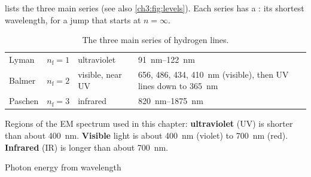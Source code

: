  lists the three main series (see also \cref{ch3:fig:levels}). Each
series has a : its shortest wavelength, for a jump that starts at
$n = \infty$.

\begin{table}
  \caption{The three main series of hydrogen lines.}\label{ch3:tab:series}
  \centering
  \begin{tabular}{@{}L{20mm}L{18mm}L{30mm}L{66mm}@{}}
    \toprule
     &  &  & \\
    \midrule
    Lyman   & $n_\mathrm{f} = 1$ & ultraviolet & \qtyrange{91}{122}{nm}\\
    Balmer  & $n_\mathrm{f} = 2$ & visible, near UV & 656, 486, 434, \qty{410}{nm} (visible),
              then UV lines down to \qty{365}{nm}\\
    Paschen & $n_\mathrm{f} = 3$ & infrared & \qtyrange{820}{1875}{nm}\\
    \bottomrule
  \end{tabular}
\end{table}

Regions of the EM spectrum used in this chapter: \textbf{ultraviolet} (UV) is shorter than
about \qty{400}{nm}. \textbf{Visible} light is about \qty{400}{nm} (violet) to \qty{700}{nm}
(red). \textbf{Infrared} (IR) is longer than about \qty{700}{nm}.

\begin{formulacard}[combine={$E = hf$ and $v = f\lambda$}]{Photon energy from wavelength}
  \begin{symbols}
  \end{symbols}
\end{formulacard}

